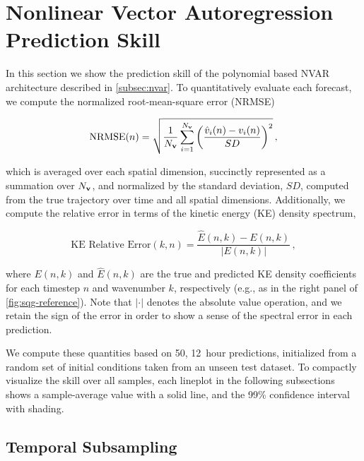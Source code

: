 \section{Nonlinear Vector Autoregression Prediction Skill}
\label{sec:nvar-results}

In this section we show the prediction skill of the polynomial based NVAR architecture
described in \cref{subsec:nvar}.
To quantitatively evaluate each forecast, we compute
the normalized root-mean-square error (NRMSE)
\begin{linenomath*}\begin{equation}
    \text{NRMSE}(n) = \sqrt{\dfrac{1}{N_{\mathbf{v}}}\sum_{i=1}^{N_{\mathbf{v}}}\left(
        \dfrac{\hat{v}_i(n) - v_i(n)}{SD}
        \right)^2 } \, ,
    \label{eq:nrmse}
\end{equation}\end{linenomath*}
which is averaged over each spatial dimension, succinctly represented as a
summation over $N_{\mathbf{v}}$, and normalized by the standard deviation, $SD$,
computed from the true trajectory over time and all spatial dimensions.
Additionally, we compute the relative error in terms of the kinetic energy
(KE) density spectrum,
\begin{linenomath*}\begin{equation}
    \text{KE Relative Error}(k, n) =
    \dfrac{\hat{E}(n, k) - E(n, k)}{|E(n,k)|} \, ,
    \label{eq:ke_relerr}
\end{equation}\end{linenomath*}
where $E(n,k)$ and $\hat{E}(n,k)$ are the true and predicted KE density coefficients
for each timestep $n$ and wavenumber $k$, respectively (e.g., as in the right
panel of \cref{fig:sqg-reference}).
Note that $|\cdot|$ denotes the absolute value operation,
and we retain the sign of the error in order to show a sense of the
spectral error in each prediction.

We compute these quantities based on 50, 12~hour predictions, initialized from a random
set of initial conditions taken from an unseen test dataset.
To compactly visualize the skill over all samples, each lineplot in the
following subsections shows a sample-average value with a solid line, and the
99\% confidence interval with shading.

\subsection{Temporal Subsampling}
\label{subsec:nvar-subsampling}



